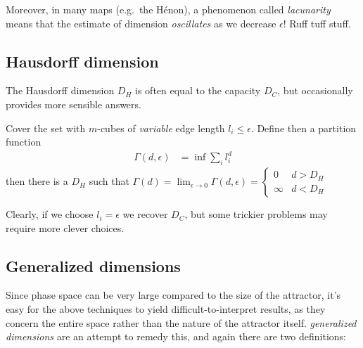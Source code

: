 \documentclass[10pt]{article}
\begin{document}
Moreover, in many maps (e.g.\ the H\'enon), a phenomenon called
\emph{lacunarity} means that the estimate of dimension \emph{oscillates} as we
decrease $\epsilon$! Ruff tuff stuff.

\subsection{Hausdorff dimension}

The Hausdorff dimension $D_H$ is often equal to the capacity $D_C$, but
occasionally provides more sensible answers.

Cover the set with $m$-cubes of \emph{variable} edge length $l_i \leq \epsilon$.
Define then a partition function
\begin{align}
    \Gamma(d, \epsilon) &= \inf \sum\limits_{i}^{}l_i^d
\end{align}
then there is a  $D_H$ such that
$\Gamma(d) = \lim_{\epsilon \to 0} \Gamma(d,\epsilon) =
\begin{cases}
    0 & d > D_H\\
    \infty & d < D_H
\end{cases}$

Clearly, if we choose $l_i = \epsilon$ we recover $D_C$, but some trickier
problems may require more clever choices.

\subsection{Generalized dimensions}

Since phase space can be very large compared to the size of the attractor, it's
easy for the above techniques to yield difficult-to-interpret results, as they
concern the entire space rather than the nature of the attractor itself.
\emph{generalized dimensions} are an attempt to remedy this, and again there are
two definitions:
\end{document}
